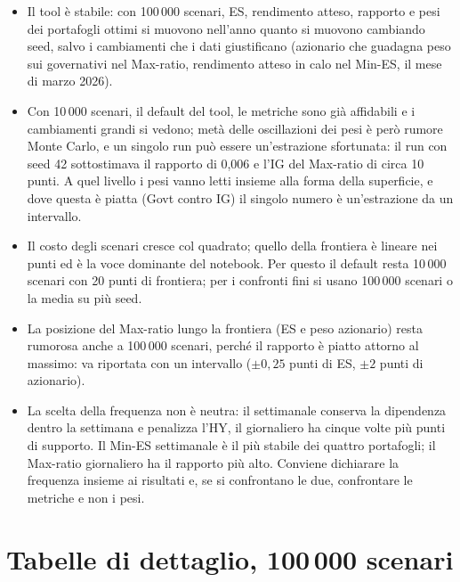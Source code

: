\documentclass[11pt,a4paper]{article}
\begin{document}
\begin{itemize}
\item Il tool \`e stabile: con 100\,000 scenari, ES, rendimento atteso, rapporto e pesi dei portafogli ottimi si muovono nell'anno quanto si muovono cambiando seed, salvo i cambiamenti che i dati giustificano (azionario che guadagna peso sui governativi nel Max-ratio, rendimento atteso in calo nel Min-ES, il mese di marzo 2026).
\item Con 10\,000 scenari, il default del tool, le metriche sono gi\`a affidabili e i cambiamenti grandi si vedono; met\`a delle oscillazioni dei pesi \`e per\`o rumore Monte Carlo, e un singolo run pu\`o essere un'estrazione sfortunata: il run con seed 42 sottostimava il rapporto di 0,006 e l'IG del Max-ratio di circa 10 punti. A quel livello i pesi vanno letti insieme alla forma della superficie, e dove questa \`e piatta (Govt contro IG) il singolo numero \`e un'estrazione da un intervallo.
\item Il costo degli scenari cresce col quadrato; quello della frontiera \`e lineare nei punti ed \`e la voce dominante del notebook. Per questo il default resta 10\,000 scenari con 20 punti di frontiera; per i confronti fini si usano 100\,000 scenari o la media su pi\`u seed.
\item La posizione del Max-ratio lungo la frontiera (ES e peso azionario) resta rumorosa anche a 100\,000 scenari, perch\'e il rapporto \`e piatto attorno al massimo: va riportata con un intervallo ($\pm 0{,}25$ punti di ES, $\pm 2$ punti di azionario).
\item La scelta della frequenza non \`e neutra: il settimanale conserva la dipendenza dentro la settimana e penalizza l'HY, il giornaliero ha cinque volte pi\`u punti di supporto. Il Min-ES settimanale \`e il pi\`u stabile dei quattro portafogli; il Max-ratio giornaliero ha il rapporto pi\`u alto. Conviene dichiarare la frequenza insieme ai risultati e, se si confrontano le due, confrontare le metriche e non i pesi.
\end{itemize}

\appendix
\section{Tabelle di dettaglio, 100\,000 scenari}


\end{document}
